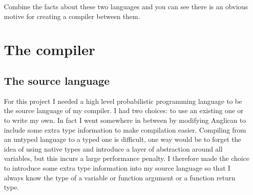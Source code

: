\documentclass[a4paper]{article}
\begin{document}
Combine the facts about these two languages and you can see there is an obvious motive for creating a compiler between them.




\section{The compiler}




\subsection{The source language}

For this project I needed a high level probabilistic programming language to be the source language of my compiler. I had two choices: to use an existing one or to write my own. In fact I went somewhere in between by modifying Anglican to include some extra type information to make compilation easier. Compiling from an untyped language to a typed one is difficult, one way would be to forget the idea of using native types and introduce a layer of abstraction around all variables, but this incurs a large performance penalty. I therefore made the choice to introduce some extra type information into my source language so that I always know the type of a variable or function argument or a function return type.
\end{document}
